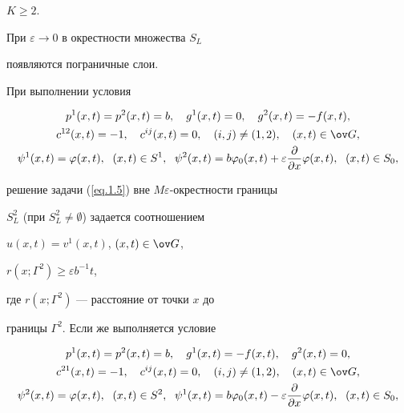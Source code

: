 $K\ge 2$.





При $\varepsilon\to 0$ в окрестности множества $S_L$


появляются пограничные слои.





При выполнении условия


\begin{gather}


p^1(x, t)=p^2(x, t)=b, \quad g^1(x, t)=0, \quad


g^2(x, t)=-f(x, t), \notag \\


%


\label{eq.1.7}


c^{12}(x,t)=-1, \quad c^{ij}(x,t)=0, \quad (i,j)\ne(1,2),


\quad (x,t)\in \ov G,\\


%


\psi^1(x, t)=\varphi(x, t), \ \; (x,t)\in S^1,\ \;


\psi^2(x, t)=b \varphi_0(x, t)+\varepsilon


\frac{\partial}{\partial x} \varphi(x,t), \ \;


(x,t)\in S_0, \notag


\end{gather}


решение задачи (\ref{eq.1.5}) вне $M\varepsilon$-окрестности границы


$S^2_L$ (при $S^2_L\ne\emptyset$) задается соотношением


$u(x, t)=v^1(x, t)$, $(x, t)\in\ov G$,


$r(x; \varGamma^2)\ge \varepsilon b^{-1} t$,


где $r(x; \varGamma^2)$ --- расстояние от точки $x$ до


границы $\varGamma^2$. Если же выполняется условие


\begin{gather*}


\label{eq.1.8}


p^1(x, t)=p^2(x, t)=b,


\quad g^1(x, t)=-f(x, t), \quad g^2(x, t)=0, \\


%


c^{21}(x,t)=-1, \quad c^{ij}(x,t)=0, \quad (i,j)\ne(1,2),


\quad (x,t)\in \ov G,\\


%


\psi^2(x,t)=\varphi(x,t), \ \; (x,t)\in S^2, \ \;


\psi^1(x,t)=b \varphi_0(x,t)- \varepsilon


\frac{\partial}{\partial x} \varphi(x,t), \ \;


(x,t)\in S_0,


\end{gather*}


